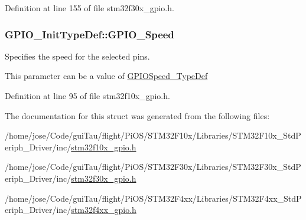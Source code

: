 Definition at line 155 of file stm32f30x\-\_\-gpio.\-h.

\hypertarget{struct_g_p_i_o___init_type_def_ac05832cacebc861a9acf5294d702c16b}{
\subsubsection[{G\-P\-I\-O\-\_\-\-Speed}]{ G\-P\-I\-O\-\_\-\-Init\-Type\-Def\-::\-G\-P\-I\-O\-\_\-\-Speed}}\label{struct_g_p_i_o___init_type_def_ac05832cacebc861a9acf5294d702c16b}
\begin{DoxyVerb}  Specifies the speed for the selected pins.
\end{DoxyVerb}
 This parameter can be a value of \hyperlink{stm32f4xx__gpio_8h_a062ad92b67b4a1f301c161022cf3ba8e}{G\-P\-I\-O\-Speed\-\_\-\-Type\-Def} 

Definition at line 95 of file stm32f10x\-\_\-gpio.\-h.



The documentation for this struct was generated from the following files\-:\begin{DoxyCompactItemize}
\item 
/home/jose/\-Code/gui\-Tau/flight/\-Pi\-O\-S/\-S\-T\-M32\-F10x/\-Libraries/\-S\-T\-M32\-F10x\-\_\-\-Std\-Periph\-\_\-\-Driver/inc/\hyperlink{stm32f10x__gpio_8h}{stm32f10x\-\_\-gpio.\-h}\item 
/home/jose/\-Code/gui\-Tau/flight/\-Pi\-O\-S/\-S\-T\-M32\-F30x/\-Libraries/\-S\-T\-M32\-F30x\-\_\-\-Std\-Periph\-\_\-\-Driver/inc/\hyperlink{stm32f30x__gpio_8h}{stm32f30x\-\_\-gpio.\-h}\item 
/home/jose/\-Code/gui\-Tau/flight/\-Pi\-O\-S/\-S\-T\-M32\-F4xx/\-Libraries/\-S\-T\-M32\-F4xx\-\_\-\-Std\-Periph\-\_\-\-Driver/inc/\hyperlink{stm32f4xx__gpio_8h}{stm32f4xx\-\_\-gpio.\-h}\end{DoxyCompactItemize}
